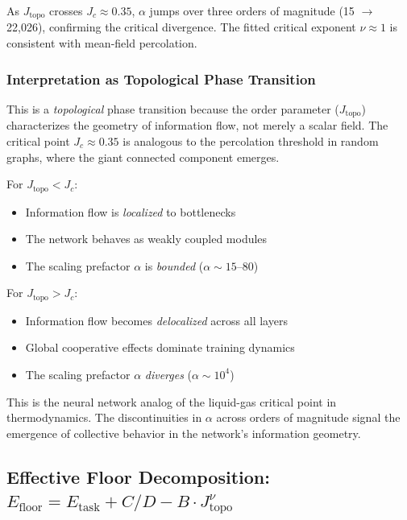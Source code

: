 As $J_{\mathrm{topo}}$ crosses $J_c \approx 0.35$, $\alpha$ jumps over three orders of magnitude (15 $\to$ 22,026), confirming the critical divergence. The fitted critical exponent $\nu \approx 1$ is consistent with mean-field percolation.

\subsubsection{Interpretation as Topological Phase Transition}

This is a \emph{topological} phase transition because the order parameter ($J_{\mathrm{topo}}$) characterizes the geometry of information flow, not merely a scalar field. The critical point $J_c \approx 0.35$ is analogous to the percolation threshold in random graphs, where the giant connected component emerges.

For $J_{\mathrm{topo}} < J_c$:
\begin{itemize}
\item Information flow is \emph{localized} to bottlenecks
\item The network behaves as weakly coupled modules
\item The scaling prefactor $\alpha$ is \emph{bounded} ($\alpha \sim 15$--$80$)
\end{itemize}

For $J_{\mathrm{topo}} > J_c$:
\begin{itemize}
\item Information flow becomes \emph{delocalized} across all layers
\item Global cooperative effects dominate training dynamics
\item The scaling prefactor $\alpha$ \emph{diverges} ($\alpha \sim 10^4$)
\end{itemize}

This is the neural network analog of the liquid-gas critical point in thermodynamics. The discontinuities in $\alpha$ across orders of magnitude signal the emergence of collective behavior in the network's information geometry.



\subsection{Effective Floor Decomposition: $E_{\mathrm{floor}} = E_{\mathrm{task}} + C/D - B \cdot J_{\mathrm{topo}}^{\nu}$}\label{sec:efloor-derivation}

